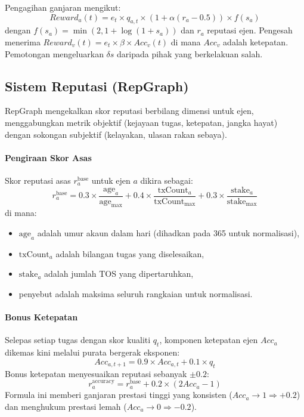 \documentclass[11pt]{article}
\begin{document}
Pengagihan ganjaran mengikut:
\begin{equation}
Reward_a(t) = e_t \times q_{a,t} \times \left(1 + \alpha (r_a - 0.5)\right) \times f(s_a)
\end{equation}
dengan $f(s_a) = \min(2, 1 + \log(1+s_a))$ dan $r_a$ reputasi ejen. Pengesah menerima $Reward_v(t) = e_t \times \beta \times Acc_v(t)$ di mana $Acc_v$ adalah ketepatan. Pemotongan mengeluarkan $\delta s$ daripada pihak yang berkelakuan salah.

\subsection{Sistem Reputasi (RepGraph)}
\label{sec:reputation}
RepGraph mengekalkan skor reputasi berbilang dimensi untuk ejen, menggabungkan metrik objektif (kejayaan tugas, ketepatan, jangka hayat) dengan sokongan subjektif (kelayakan, ulasan rakan sebaya).

\paragraph{Pengiraan Skor Asas} Skor reputasi asas $r_a^{\text{base}}$ untuk ejen $a$ dikira sebagai:
\begin{equation}
r_a^{\text{base}} = 0.3 \times \frac{\text{age}_a}{\text{age}_{\max}} + 0.4 \times \frac{\text{txCount}_a}{\text{txCount}_{\max}} + 0.3 \times \frac{\text{stake}_a}{\text{stake}_{\max}}
\end{equation}
di mana:
\begin{itemize}[noitemsep]
  \item $\text{age}_a$ adalah umur akaun dalam hari (dihadkan pada 365 untuk normalisasi),
  \item $\text{txCount}_a$ adalah bilangan tugas yang diselesaikan,
  \item $\text{stake}_a$ adalah jumlah TOS yang dipertaruhkan,
  \item penyebut adalah maksima seluruh rangkaian untuk normalisasi.
\end{itemize}

\paragraph{Bonus Ketepatan} Selepas setiap tugas dengan skor kualiti $q_t$, komponen ketepatan ejen $Acc_a$ dikemas kini melalui purata bergerak eksponen:
\begin{equation}
Acc_{a,t+1} = 0.9 \times Acc_{a,t} + 0.1 \times q_t
\end{equation}
Bonus ketepatan menyesuaikan reputasi sebanyak $\pm 0.2$:
\begin{equation}
r_a^{\text{accuracy}} = r_a^{\text{base}} + 0.2 \times (2 Acc_a - 1)
\end{equation}
Formula ini memberi ganjaran prestasi tinggi yang konsisten ($Acc_a \to 1 \Rightarrow +0.2$) dan menghukum prestasi lemah ($Acc_a \to 0 \Rightarrow -0.2$).
\end{document}
